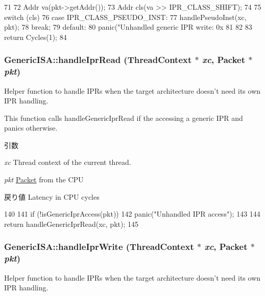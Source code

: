 \begin{DoxyCode}
71 {
72     Addr va(pkt->getAddr());
73     Addr cls(va >> IPR_CLASS_SHIFT);
74 
75     switch (cls) {
76     case IPR_CLASS_PSEUDO_INST:
77         handlePseudoInst(xc, pkt);
78         break;
79     default:
80         panic("Unhandled generic IPR write: 0x%
81     }
82 
83     return Cycles(1);
84 }
\end{DoxyCode}
\hypertarget{namespaceGenericISA_a0b95fcdc1e1fe57dbb4fcad449a6efd8}{
\subsubsection[{handleIprRead}]{ GenericISA::handleIprRead ({\bf ThreadContext} $\ast$ {\em xc}, \/  {\bf Packet} $\ast$ {\em pkt})}}
\label{namespaceGenericISA_a0b95fcdc1e1fe57dbb4fcad449a6efd8}
Helper function to handle IPRs when the target architecture doesn't need its own IPR handling.

This function calls handleGenericIprRead if the accessing a generic IPR and panics otherwise.


\begin{DoxyParams}{引数}
\item[{\em xc}]Thread context of the current thread. \item[{\em pkt}]\hyperlink{classPacket}{Packet} from the CPU \end{DoxyParams}
\begin{DoxyReturn}{戻り値}
Latency in CPU cycles 
\end{DoxyReturn}



\begin{DoxyCode}
140     {
141         if (!isGenericIprAccess(pkt))
142             panic("Unhandled IPR access\n");
143 
144         return handleGenericIprRead(xc, pkt);
145     }
\end{DoxyCode}
\hypertarget{namespaceGenericISA_a31c83a2af3232333d9a399a2878dc729}{
\subsubsection[{handleIprWrite}]{ GenericISA::handleIprWrite ({\bf ThreadContext} $\ast$ {\em xc}, \/  {\bf Packet} $\ast$ {\em pkt})}}
\label{namespaceGenericISA_a31c83a2af3232333d9a399a2878dc729}
Helper function to handle IPRs when the target architecture doesn't need its own IPR handling.

